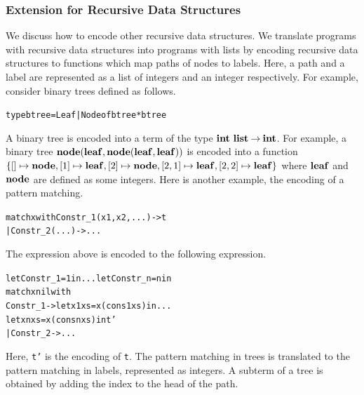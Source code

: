 


\subsubsection{Extension for Recursive Data Structures}
We discuss how to encode other recursive data structures.  We
translate programs with recursive data structures into programs with
lists by encoding recursive data structures to functions which map paths
of nodes to labels.  Here, a path and a label are represented as a list
of integers and an integer respectively.  For example, consider binary trees defined
as follows.
\begin{alltt}
type btree = Leaf | Node of btree * btree
\end{alltt}
A binary tree is encoded into a term of the type
${{\mathbf{int}}\ \mathbf{list}}\mathbin{\rightarrow}{\mathbf{int}}$.  For example, a binary tree
$\mathbf{node}({\mathbf{leaf}},{\mathbf{node}({\mathbf{leaf}},{\mathbf{leaf}})})$ is encoded into a function $\{[]
\mapsto \mathbf{node}, [1] \mapsto \mathbf{leaf}, [2] \mapsto \mathbf{node}, [2,1] \mapsto
\mathbf{leaf}, [2,2] \mapsto \mathbf{leaf}\}$ where $\mathbf{leaf}$ and $\mathbf{node}$ are defined as
some integers.
Here is another example, the encoding of a pattern matching.
\begin{alltt}
match x with Constr_1(x1, x2, ...) -> t
           | Constr_2(...) -> ...
\end{alltt}
The expression above is encoded to the following expression.
\begin{alltt}
let Constr_1 = 1 in ... let Constr_n = n in
  match x nil with
      Constr_1 -> let x1 xs = x (cons 1 xs) in ...
                  let xn xs = x (cons n xs) in t'
    | Constr_2 -> ...
\end{alltt}
Here, \texttt{t'} is the encoding of \texttt{t}. The pattern matching in
trees is translated to the pattern matching in labels, represented as
integers.  A subterm of a tree is obtained by adding the index to the head of the path.

